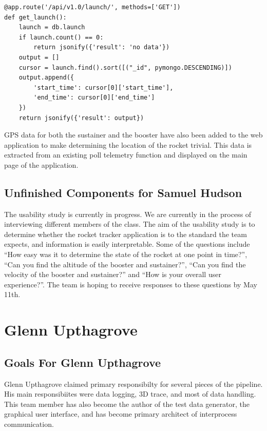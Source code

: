 \documentclass[onecolumn, draftclsnofoot,10pt, compsoc]{IEEEtran}
\begin{document}
\begin{lstlisting}
@app.route('/api/v1.0/launch/', methods=['GET'])
def get_launch():
    launch = db.launch
    if launch.count() == 0:
        return jsonify({'result': 'no data'})
    output = []
    cursor = launch.find().sort([("_id", pymongo.DESCENDING)])
    output.append({
        'start_time': cursor[0]['start_time'],
        'end_time': cursor[0]['end_time']
    })
    return jsonify({'result': output})
\end{lstlisting}
GPS data for both the sustainer and the booster have also been added to the web application to make determining the location of the rocket trivial. This data is extracted from an existing poll telemetry function and displayed on the main page of the application. 
\subsection{Unfinished Components for Samuel Hudson}
The usability study is currently in progress. We are currently in the process of interviewing different members of the class. The aim of the usability study is to determine whether the rocket tracker application is to the standard the team expects, and information is easily interpretable. Some of the questions include “How easy was it to determine the state of the rocket at one point in time?”, “Can you find the altitude of the booster and sustainer?”, “Can you find the velocity of the booster and sustainer?” and “How is your overall user experience?”. The team is hoping to receive responses to these questions by May 11th. 

\section {Glenn Upthagrove} 
\subsection {Goals For Glenn Upthagrove}
Glenn Upthagrove claimed primary responsibilty for several pieces of the pipeline. His main responsibiites were data logging, 3D trace, and most of data handling. This team member has also become the author of the test data generator, the graphical user interface, and has become primary architect of interprocess communication.
\end{document}
